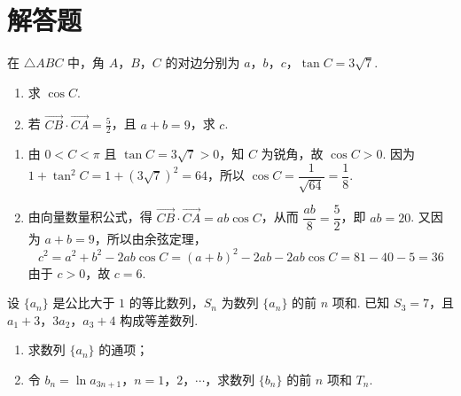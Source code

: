 \section{解答题}

\begin{problem}
在 \(\triangle ABC\) 中，角 \(A\)，\(B\)，\(C\) 的对边分别为 \(a\)，\(b\)，\(c\)，\(\tan C = 3\sqrt{7}\).

\begin{enumerate}
\item 求 \( \cos C \).
\item 若 \( \overrightarrow{CB} \cdot \overrightarrow{CA} = \frac{5}{2} \)，且 \( a + b = 9 \)，求 \(c\).
\end{enumerate}
\end{problem}

\begin{solution}
\begin{enumerate}
\item 由 \(0<C<\pi\) 且 \(\tan C=3\sqrt{7}>0\)，知 \(C\) 为锐角，故 \(\cos C>0\). 因为 \(1+\tan^{2}C=1+\left(3\sqrt{7}\right)^{2}=64\)，所以 \(\cos C=\dfrac{1}{\sqrt{64}}=\dfrac{1}{8}\).
\item 由向量数量积公式，得 \(\overrightarrow{CB}\cdot\overrightarrow{CA}=ab\cos C\)，从而 \(\dfrac{ab}{8}=\dfrac{5}{2}\)，即 \(ab=20\). 又因为 \(a+b=9\)，所以由余弦定理，
\[
c^{2}=a^{2}+b^{2}-2ab\cos C=(a+b)^{2}-2ab-2ab\cos C=81-40-5=36
\]
由于 \(c>0\)，故 \(c=6\).
\end{enumerate}
\end{solution}

\begin{problem}
设 \(\{a_{n}\}\) 是公比大于 \(1\) 的等比数列，\(S_{n}\) 为数列 \(\{a_{n}\}\) 的前 \(n\) 项和. 已知 \(S_{3} = 7\)，且 \(a_{1} + 3\)，\(3a_{2}\)，\(a_{3} + 4\) 构成等差数列.

\begin{enumerate}
\item 求数列 \( \{a_{n}\} \) 的通项；
\item 令 \(b_{n} = \ln a_{3n + 1}\)，\(n = 1\)，\(2\)，\(\cdots\)，求数列 \( \{b_{n}\} \) 的前 \( n \) 项和 \( T_{n} \).
\end{enumerate}
\end{problem}

